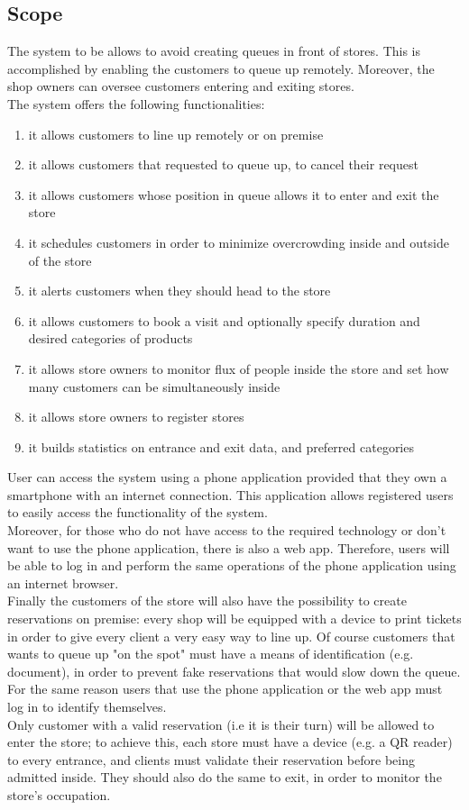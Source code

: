 \subsection{Scope}
The system to be allows to avoid creating queues in front of stores.
This is accomplished by enabling the customers to queue up remotely.
Moreover, the shop owners can oversee customers entering and exiting stores. \\
The system offers the following functionalities:
\begin{enumerate}[label=F\arabic*]
	\item it allows customers to line up remotely or on premise
	\item it allows customers that requested to queue up, to cancel their request
	\item it allows customers whose position in queue allows it to enter and exit the store
	\item it schedules customers in order to minimize overcrowding inside and outside of the store
	\item it alerts customers when they should head to the store
	\item it allows customers to book a visit and optionally specify duration and desired categories of products
	\item it allows store owners to monitor flux of people inside the store and set how many customers can be simultaneously inside
	\item it allows store owners to register stores
	\item it builds statistics on entrance and exit data, and preferred categories
\end{enumerate}
User can access the system using a phone application provided that they own a smartphone with an internet connection. This application allows registered users to easily access the functionality of the system.\\Moreover, for those who do not have access to the required technology or don't want to use the phone application, there is also a web app. Therefore, users will be able to log in and perform the same operations of the phone application using an internet browser.\\ Finally the customers of the store will also have the possibility to create reservations on premise: every shop will be equipped with a device to print tickets in order to give every client a very easy way to line up. Of course customers that wants to queue up "on the spot" must have a means of identification (e.g. document), in order to prevent fake reservations that would slow down the queue. For the same reason users that use the phone application or the web app must log in to identify themselves.\\
Only customer with a valid reservation (i.e it is their turn) will be allowed to enter the store; to achieve this, each store must have a device (e.g. a QR reader) to every entrance, and clients must validate their reservation before being admitted inside. They should also do the same to exit, in order to monitor the store's occupation.
